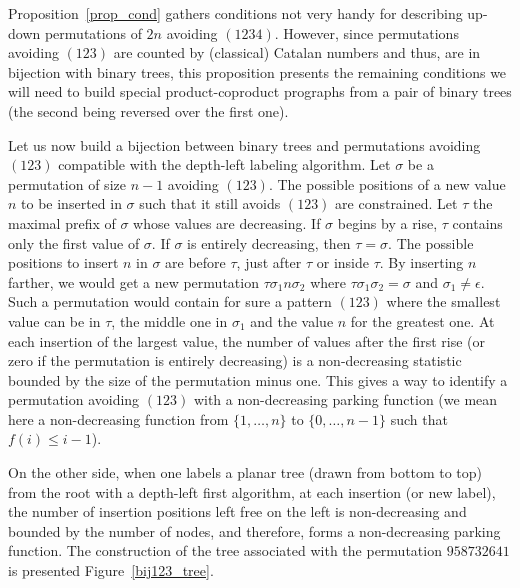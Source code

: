 \documentclass{amsart}
\begin{document}
Proposition~\ref{prop_cond} gathers conditions not very
handy for describing up-down permutations of $2n$ avoiding
$(1234)$. However, since permutations
avoiding $(123)$ are counted by (classical) Catalan numbers and thus,
are in bijection with binary trees, this proposition presents the
remaining conditions we will need to build special product-coproduct
prographs from a pair of binary trees (the second being reversed
over the first one).


Let us now build a bijection between binary trees and permutations
avoiding $(123)$ compatible with the depth-left labeling algorithm.
Let $\sigma$ be a permutation of size $n-1$ avoiding $(123)$. The
possible positions of a new value $n$ to be inserted in $\sigma$ such
that it still avoids $(123)$ are constrained. Let $\tau$ the maximal
prefix of $\sigma$ whose values are decreasing. If $\sigma$ begins by
a rise, $\tau$ contains only the first value of $\sigma$. If
$\sigma$ is entirely decreasing, then $\tau = \sigma$. The possible
positions to insert $n$ in $\sigma$ are before $\tau$, just after
$\tau$ or inside $\tau$. By inserting $n$ farther, we would
get a new permutation $\tau \sigma_1 n \sigma_2$ where
$\tau \sigma_1 \sigma_2 = \sigma$ and $\sigma_1 \neq \epsilon$. Such a permutation
would contain for sure a pattern $(123)$ where the smallest value can
be in $\tau$, the middle one in $\sigma_1$ and the value $n$ for the
greatest one. At each insertion of the largest value, the number of
values after the first rise (or zero if the permutation is entirely
decreasing) is a non-decreasing statistic bounded by the size of the
permutation minus one. This gives a way to identify a permutation
avoiding $(123)$ with a non-decreasing parking function (we mean here
a non-decreasing function from $\{1, \dots , n\}$ to $\{0, \dots ,n-1\}$
such that $f(i) \leqslant i-1$).


On the other side, when one labels a planar tree (drawn from bottom to
top) from the root with a depth-left first algorithm, at each insertion (or
new label), the number of insertion positions left free on the left
is non-decreasing and bounded by the number of nodes, and therefore,
forms a non-decreasing parking function. The construction of the tree
associated with the permutation $958732641$ is presented Figure~\ref{bij123_tree}.
\end{document}

